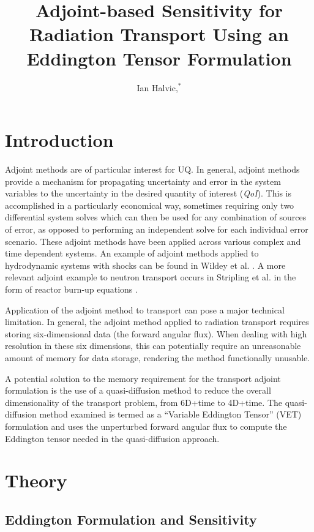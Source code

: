 \documentclass{anstrans}
\title{Adjoint-based Sensitivity for Radiation Transport Using an Eddington Tensor Formulation}
\author{Ian Halvic,$^{*}$}
\institute{
$^{*}$ Texas A\&M University,
College Station, TX, iwhalvic@tamu.edu}
\newcommand{\qoi}{{\it QoI}\xspace}
\begin{document}
\section{Introduction}


Adjoint methods are of particular interest for UQ. In general, adjoint methods provide a mechanism for propagating uncertainty and error in the system variables to the uncertainty in the desired quantity of interest (\qoi). This is accomplished in a particularly economical way, sometimes requiring only two differential system solves which can then be used for any combination of sources of error, as opposed to performing an independent solve for each individual error scenario. These adjoint methods have been applied across various complex and time dependent systems. An example of adjoint methods applied to hydrodynamic systems with shocks can be found in Wildey et al. \cite{Wildey}. A more relevant adjoint example to neutron transport occurs in Stripling et al. in the form of reactor burn-up equations \cite{Stripling}.


Application of the adjoint method to transport can pose a major technical limitation. In general, the adjoint method applied to radiation transport requires storing six-dimensional data (the forward angular flux). When dealing with high resolution in these six dimensions, this can potentially require an unreasonable amount of memory for data storage, rendering the method functionally unusable. 

A potential solution to the memory requirement for the transport adjoint formulation is the use of a quasi-diffusion method to reduce the overall dimensionality of the transport problem, from 6D+time to 4D+time. The quasi-diffusion method examined is termed  as a ``Variable Eddington Tensor'' (VET) formulation and uses the unperturbed forward angular flux to compute the Eddington tensor needed in the quasi-diffusion approach. 
\section{Theory}
\subsection{Eddington Formulation and Sensitivity}
\end{document}
